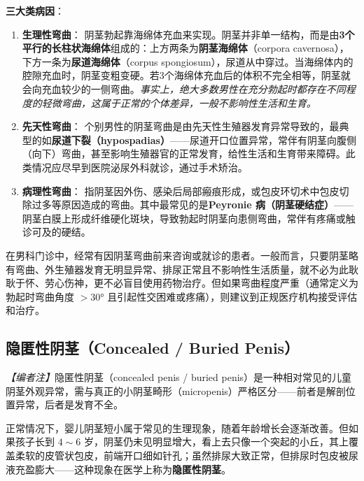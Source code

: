 \documentclass[12pt,a4paper,twoside]{ctexbook}
\begin{document}
\vspace{0.5em}
\noindent\textbf{三大类病因}：

\begin{enumerate}
	\item \textbf{生理性弯曲}：
	阴茎勃起靠海绵体充血来实现。阴茎并非单一结构，而是由\textbf{3个平行的长柱状海绵体}组成的：上方两条为\textbf{阴茎海绵体}（corpora cavernosa），下方一条为\textbf{尿道海绵体}（corpus spongiosum），尿道从中穿过。当海绵体内的腔隙充血时，阴茎变粗变硬。若3个海绵体充血后的体积不完全相等，阴茎就会向充血较少的一侧弯曲。\textit{事实上，绝大多数男性在充分勃起时都存在不同程度的轻微弯曲，这属于正常的个体差异，一般不影响性生活和生育。}

	\item \textbf{先天性弯曲}：
	个别男性的阴茎弯曲是由先天性生殖器发育异常导致的，最典型的如\textbf{尿道下裂（hypospadias）}——尿道开口位置异常，常伴有阴茎向腹侧（向下）弯曲，甚至影响生殖器官的正常发育，给性生活和生育带来障碍。此类情况应尽早到医院泌尿外科就诊，通过手术矫治。

	\item \textbf{病理性弯曲}：
	指阴茎因外伤、感染后局部瘢痕形成，或包皮环切术中包皮切除过多等原因造成的弯曲。其中最常见的是\textbf{Peyronie 病（阴茎硬结症）}——阴茎白膜上形成纤维硬化斑块，导致勃起时阴茎向患侧弯曲，常伴有疼痛或触诊可及的硬结。
\end{enumerate}

\begin{tcolorbox}[colback=pink!5!white,colframe=red!50!black,title=贴心小叮咛]
在男科门诊中，经常有因阴茎弯曲前来咨询或就诊的患者。一般而言，只要阴茎略有弯曲、外生殖器发育无明显异常、排尿正常且不影响性生活质量，就不必为此耿耿于怀、劳心伤神，更不必盲目使用药物治疗。但如果弯曲程度严重（通常定义为勃起时弯曲角度 $> 30°$ 且引起性交困难或疼痛），则建议到正规医疗机构接受评估和治疗。
\end{tcolorbox}

\subsection{隐匿性阴茎（Concealed / Buried Penis）}

\noindent\textit{【编者注】}隐匿性阴茎（concealed penis / buried penis）是一种相对常见的儿童阴茎外观异常，需与真正的小阴茎畸形（micropenis）严格区分——前者是解剖位置异常，后者是发育不全。

\vspace{0.5em}
正常情况下，婴儿阴茎短小属于常见的生理现象，随着年龄增长会逐渐改善。但如果孩子长到 $4\sim6$ 岁，阴茎仍未见明显增大，看上去只像一个突起的小丘，其上覆盖柔软的皮管状包皮，前端开口细如针孔；虽然排尿大致正常，但排尿时包皮被尿液充盈膨大——这种现象在医学上称为\textbf{隐匿性阴茎}。
\end{document}
